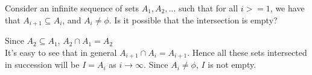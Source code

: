 \documentclass[boxes, qed]{homework}
\begin{document}
\newenvironment{amatrix}[1]{%
  \left[\begin{array}{@{}*{#1}{c}|c@{}}
}{%
  \end{array}\right]
}

\newenvironment{augmatrix}[1]{%
  \left[\begin{array}{#1}
}{%
  \end{array}\right]
}

\begin{problem}Consider an infinite sequence of sets 
  $A_1, A_2,\dots$ such that for all $i>=1$, we have that 
  $A_{i+1}\subseteq{A_i}$, and $A_i\ne{\phi}$. 
  Is it possible that the intersection is empty?
\end{problem}
\begin{solution}Since $A_2\subseteq{A_1}$, $A_2\cap{A_1}=A_2$\\
  It's easy to see that in general $A_{i+1}\cap{A_i}=A_{i+1}$. 
  Hence all these sets intersected in succession will be
  $I=A_{i}$ as $i\rightarrow{\infty}$. Since $A_i\ne{\phi}$,
  $I$ is not empty.
\end{solution}
\end{document}

